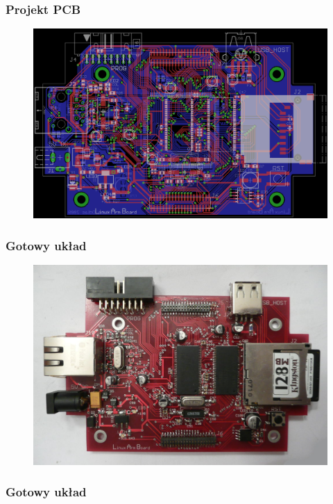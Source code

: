 \documentclass[xcolor=dvipsnames]{beamer}
\newenvironment{ramka}{\begin{frame}}
{
		\end{frame}
}
\begin{document}
	\begin{ramka}
		\frametitle{Projekt PCB}
		\begin{figure}[h]
			\includegraphics[scale=0.7]{text/img/main_brd.png} 
		\end{figure}
	\end{ramka}
	
	\begin{ramka}
		\frametitle{Gotowy układ}
		\begin{figure}[h]
			\includegraphics[scale=0.5]{text/img/pcb1_ready_top.jpg} 
		\end{figure}
	\end{ramka}
	
		\begin{ramka}
		\frametitle{Gotowy układ}
		\begin{figure}[h]
			\hspace{10pt}
			\\
			\hspace{10pt}
		\end{figure}
	\end{ramka}
	
\end{document}
